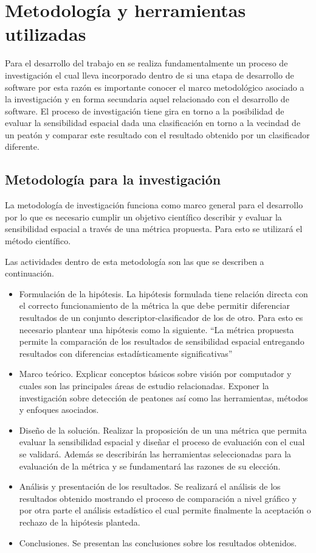 \section{Metodolog\'ia y herramientas utilizadas}
\label{intro:metodologia}

Para el desarrollo del trabajo en se realiza fundamentalmente un proceso de investigación el cual lleva incorporado dentro de si una etapa de desarrollo de software por esta razón es importante conocer el marco metodológico asociado a la investigación y en forma secundaria aquel relacionado con el desarrollo de software.
El proceso de investigación tiene gira en torno a la posibilidad de evaluar la sensibilidad espacial dada una clasificación en torno a la vecindad de un peatón y comparar este resultado con el resultado obtenido por un clasificador diferente.

\subsection{Metodología para la investigación}

La metodología de investigación funciona como marco general para el desarrollo por lo que es necesario cumplir un objetivo científico \ie describir y evaluar la sensibilidad espacial a través de una métrica propuesta. Para esto se utilizará el método científico.

Las actividades dentro de esta metodología son las que se describen a continuación.

\begin{itemize}
\item Formulación de la hipótesis. 
La hipótesis formulada tiene relación directa con el correcto funcionamiento de la métrica la que debe permitir diferenciar resultados de un conjunto descriptor-clasificador de los de otro. Para esto es necesario plantear una hipótesis como la siguiente.
\subitem ``La métrica propuesta permite la comparación de los resultados de sensibilidad espacial entregando resultados con diferencias estadísticamente significativas''
\item Marco teórico. Explicar conceptos básicos sobre visión por computador y cuales son las principales áreas de estudio relacionadas. Exponer la investigación sobre detección de peatones así como las herramientas, métodos y enfoques asociados.
\item Diseño de la solución. Realizar la proposición de un una métrica que permita evaluar la sensibilidad espacial y diseñar el proceso de evaluación con el cual se validará. Además se describirán las herramientas seleccionadas para la evaluación de la métrica y se fundamentará las razones de su elección.
\item Análisis y presentación de los resultados. Se realizará el análisis de los resultados obtenido mostrando el proceso de comparación a nivel gráfico y por otra parte el análisis estadístico el cual permite finalmente la aceptación o rechazo de la hipótesis planteda.   
\item Conclusiones. Se presentan las conclusiones sobre los resultados obtenidos.

\end{itemize}

